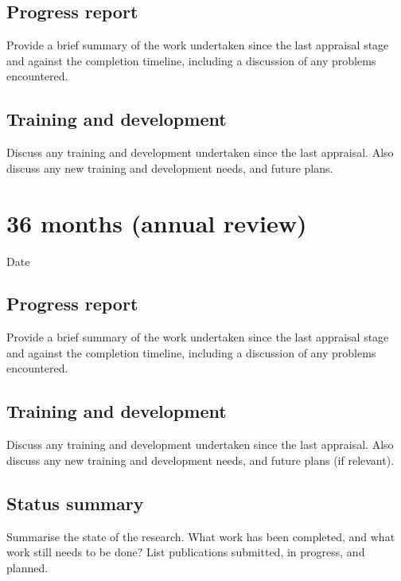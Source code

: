 \documentclass[12pt,a4paper]{article}
\begin{document}
\subsection{Progress report}
Provide a brief summary of the work undertaken since the last appraisal stage and against the completion timeline, including a discussion of any problems encountered. %

\subsection{Training and development}
Discuss any training and development undertaken since the last appraisal. Also discuss any new training and development needs, and future plans. %


\section{36 months (annual review)}

\begin{description}
	\item[Date] %
\end{description}

\subsection{Progress report}
Provide a brief summary of the work undertaken since the last appraisal stage and against the completion timeline, including a discussion of any problems encountered. %

\subsection{Training and development}
Discuss any training and development undertaken since the last appraisal. Also discuss any new training and development needs, and future plans (if relevant). %

\subsection{Status summary}
Summarise the state of the research. What work has been completed, and what work still needs to be done? List publications submitted, in progress, and planned. %
\end{document}
